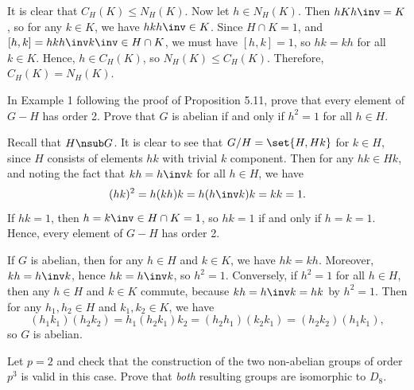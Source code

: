 \begin{sol}
    It is clear that $C_H(K) \leq N_H(K)$. Now let $h \in N_H(K)$. Then $hKh\inv = K$, so for any $k \in K$, we have $hkh\inv \in K$. Since $H \cap K = 1$, and $[h, k] = hkh\inv k\inv \in H \cap K$, we must have $[h, k] = 1$, so $hk = kh$ for all $k \in K$. Hence, $h \in C_H(K)$, so $N_H(K) \leq C_H(K)$. Therefore, $C_H(K) = N_H(K)$.
\end{sol}

\begin{exercise}\label{ex5.5.3}
    In Example 1 following the proof of Proposition 5.11, prove that every element of $G - H$ has order 2. Prove that $G$ is abelian if and only if $h^2 = 1$ for all $h \in H$.
\end{exercise}

\begin{sol}
    Recall that $H \nsub G$. It is clear to see that $G/H = \set{H, Hk}$ for $k \in H$, since $H$ consists of elements $hk$ with trivial $k$ component. Then for any $hk \in Hk$, and noting the fact that $kh = h\inv k$ for all $h \in H$, we have
    \[(hk)^2 = h(kh)k = h(h\inv k)k = kk = 1.\]
    If $hk = 1$, then $h = k\inv \in H \cap K = 1$, so $hk = 1$ if and only if $h = k = 1$. Hence, every element of $G - H$ has order 2.

    If $G$ is abelian, then for any $h \in H$ and $k \in K$, we have $hk = kh$. Moreover, $kh = h\inv k$, hence $hk = h\inv k$, so $h^2 = 1$. Conversely, if $h^2 = 1$ for all $h \in H$, then any $h \in H$ and $k \in K$ commute, because $kh = h\inv k = hk$ by $h^2 = 1$. Then for any $h_1, h_2 \in H$ and $k_1, k_2 \in K$, we have
    \[(h_1k_1)(h_2k_2) = h_1(h_2k_1)k_2 = (h_2h_1)(k_2k_1) = (h_2k_2)(h_1k_1),\]
    so $G$ is abelian.
\end{sol}

\begin{exercise}\label{ex5.5.4}
    Let $p = 2$ and check that the construction of the two non-abelian groups of order $p^3$ is valid in this case. Prove that \emph{both} resulting groups are isomorphic to $D_8$.
\end{exercise}

